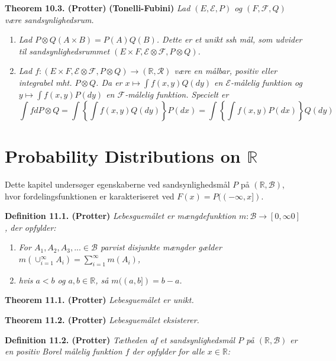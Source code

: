 \documentclass[
]{book}
\providecommand{\tightlist}{%
  \setlength{\itemsep}{0pt}\setlength{\parskip}{0pt}}
\begin{document}
\textbf{Theorem 10.3. (Protter)} \textbf{(Tonelli-Fubini)} \emph{Lad \((E,\mathcal{E},P)\) og \((F,\mathcal{F},Q)\) være sandsynlighedsrum.}

\begin{enumerate}
\def\labelenumi{\alph{enumi}.}
\tightlist
\item
  \emph{Lad \(P\otimes Q(A\times B)=P(A)Q(B)\). Dette er et unikt ssh mål, som udvider til sandsynlighedsrummet \((E\times F,\mathcal{E}\otimes \mathcal{F},P\otimes Q)\).}
\item
  \emph{Lad \(f : (E\times F,\mathcal{E}\otimes \mathcal{F},P\otimes Q) \to (\mathbb{R}, \mathcal{R})\) være en målbar, positiv eller integrabel mht. \(P\otimes Q\). Da er \(x\mapsto \int f(x,y)Q(dy)\) en \(\mathcal{E}\)-målelig funktion og \(y\mapsto \int f(x,y)P(dy)\) en \(\mathcal{F}\)-målelig funktion. Specielt er}
  \[
    \int f d P\otimes Q=\int\left\{\int f(x,y) Q(dy)\right\}P(dx)=\int\left\{\int f(x,y) P(dx)\right\}Q(dy)
    \]
\end{enumerate}

\hypertarget{probability-distributions-on-mathbb-r}{%
\section{\texorpdfstring{Probability Distributions on \(\mathbb R\)}{Probability Distributions on \textbackslash mathbb R}}\label{probability-distributions-on-mathbb-r}}

Dette kapitel undersøger egenskaberne ved sandsynlighedsmål \(P\) på \((\mathbb{R},\mathcal{B})\), hvor fordelingsfunktionen er karakteriseret ved \(F(x)=P((-\infty,x])\).

\textbf{Definition 11.1. (Protter)} \emph{Lebesguemålet er mængdefunktion \(m: \mathcal{B} \to[0,\infty0]\), der opfylder:}

\begin{enumerate}
\def\labelenumi{\roman{enumi}.}
\tightlist
\item
  \emph{For \(A_1,A_2,A_3,...\in\mathcal{B}\) parvist disjunkte mængder gælder \(m(\cup_{i=1}^\infty A_i)=\sum_{i=1}^\infty m(A_i)\),}
\item
  \emph{hvis \(a<b\) og \(a,b\in\mathbb{R}\), så \(m((a,b])=b-a\).}
\end{enumerate}

\textbf{Theorem 11.1. (Protter)} \emph{Lebesguemålet er unikt.}

\textbf{Theorem 11.2. (Protter)} \emph{Lebesguemålet eksisterer.}

\textbf{Definition 11.2. (Protter)} \emph{Tætheden af et sandsynlighedsmål \(P\) på \((\mathbb{R},\mathcal{B})\) er en positiv Borel målelig funktion \(f\) der opfylder for alle \(x\in\mathbb{R}\):}
\end{document}
